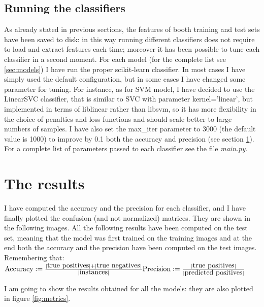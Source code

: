 \documentclass[12pt]{article}
\begin{document}
\subsection{Running the classifiers}
As already stated in previous sections, the features of booth training and test sets have been saved to disk: in this way running different classifiers does not require to load and extract features each time; moreover it has been possible to tune each classifier in a second moment.
For each model (for the complete list see \ref{sec:models}) I have run the proper scikit-learn classifier. In most cases I have simply used the default configuration, but in some cases I have changed some parameter for tuning. For instance, as for SVM model, I have decided to use the LinearSVC classifier, that is similar to SVC with parameter kernel='linear', but implemented in terms of liblinear rather than libsvm, so it has more flexibility in the choice of penalties and loss functions and should scale better to large numbers of samples. I have also set the max\_iter parameter to 3000 (the default value is 1000) to improve by 0.1 both the accuracy and precision (see section \ref{sec:results}).
For a complete list of parameters passed to each classifier see the file \textit{main.py}.

\section{The results}
\label{sec:results}
I have computed the accuracy and the precision for each classifier, and I have finally plotted the confusion (and not normalized) matrices. They are shown in the following images. All the following results have been computed on the test set, meaning that the model was first trained on the training images and at the end both the accuracy and the precision have been computed on the test images. Remembering that:
$
\newline\newline
\mbox{Accuracy}:= \frac{|\mbox{true positives}| + |\mbox{true negatives}|}{|\mbox{instances}|}
\newline\newline
\mbox{Precision}:= \frac{|\mbox{true positives}|}{|\mbox{predicted positives}|}
\newline\newline
$

I am going to show the results obtained for all the models: they are also plotted in figure \ref{fig:metrics}.
\end{document}
